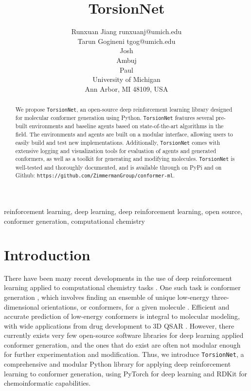 \documentclass[twoside,11pt]{article}
\newcommand{\code}[1]{\texttt{#1}}
\begin{document}
\title{TorsionNet}

\author{\name Runxuan Jiang \email runxuanj@umich.edu \\
       \name Tarun Gogineni \email tgog@umich.edu \\
       \name Josh \\
       \name Ambuj \\
       \name Paul \\
       \addr
       University of Michigan\\
       Ann Arbor, MI 48109, USA} 

\maketitle

\begin{abstract}%
  We propose \code{TorsionNet}, an open-source deep reinforcement learning library designed for molecular conformer generation using Python. \code{TorsionNet} features several pre-built environments and baseline agents based on state-of-the-art algorithms in the field. The environments and agents are built on a modular interface, allowing users to easily build and test new implementations. Additionally, \code{TorsionNet} comes with extensive logging and visualization tools for evaluation of agents and generated conformers, as well as a toolkit for generating and modifying molecules. \code{TorsionNet} is well-tested and thoroughly documented, and is available through on PyPi and on Github: \code{https://github.com/ZimmermanGroup/conformer-ml}.
\end{abstract}

\begin{keywords}
  reinforcement learning, deep learning, deep reinforcement learning, open source, conformer generation, computational chemistry
\end{keywords}

\section{Introduction}
There have been many recent developments in the use of deep reinforcement learning applied to computational chemistry tasks \citep{li2018foldingzero,zhou2017reactions,simm2020moldesign}. One such task is conformer generation \citep{gogineni2020torsionnet}, which involves finding an ensemble of unique low-energy three-dimensional orientations, or conformers, for a given molecule \citep{ebejer2020confgen}. Efficient and accurate prediction of low-energy conformers is integral to molecular modeling, with wide applications from drug development to 3D QSAR \citep{cole2018confgen}. However, there currently exists very few open-source software libraries for deep learning applied conformer generation, and the ones that do exist are often not modular enough for further experimentation and modification. Thus, we introduce \code{TorsionNet}, a comprehensive and modular Python library for applying deep reinforcement learning to conformer generation, using PyTorch \citep{torch} for deep learning and RDKit for chemoinformatic capabilities.
\end{document}
